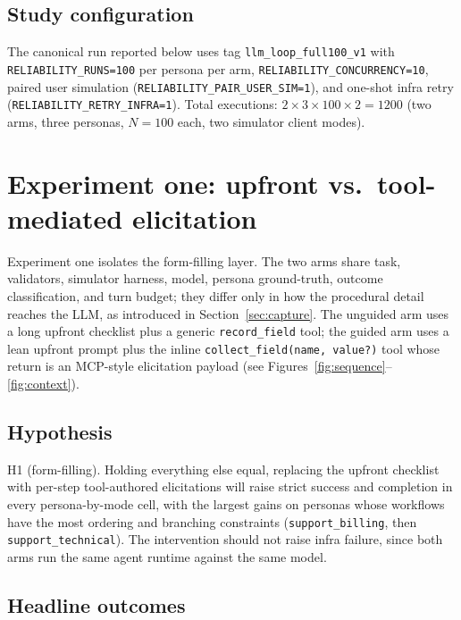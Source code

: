 \documentclass[11pt,a4paper]{article}
\begin{document}
\subsection{Study configuration}

The canonical run reported below uses tag \texttt{llm\_loop\_full100\_v1} with \texttt{RELIABILITY\_RUNS=100} per persona per arm, \texttt{RELIABILITY\_CONCURRENCY=10}, paired user simulation (\texttt{RELIABILITY\_PAIR\_USER\_SIM=1}), and one-shot infra retry (\texttt{RELIABILITY\_RETRY\_INFRA=1}). Total executions: $2 \times 3 \times 100 \times 2 = 1200$ (two arms, three personas, $N=100$ each, two simulator client modes).

\section{Experiment one: upfront vs.\ tool-mediated elicitation}
\label{sec:exp1}
\label{sec:results}

Experiment one isolates the form-filling layer. The two arms share task, validators, simulator harness, model, persona ground-truth, outcome classification, and turn budget; they differ only in how the procedural detail reaches the LLM, as introduced in Section~\ref{sec:capture}. The unguided arm uses a long upfront checklist plus a generic \texttt{record\_field} tool; the guided arm uses a lean upfront prompt plus the inline \texttt{collect\_field(name, value?)} tool whose return is an MCP-style elicitation payload (see Figures~\ref{fig:sequence}--\ref{fig:context}).

\subsection{Hypothesis}

H1 (form-filling). Holding everything else equal, replacing the upfront checklist with per-step tool-authored elicitations will raise strict success and completion in every persona-by-mode cell, with the largest gains on personas whose workflows have the most ordering and branching constraints (\texttt{support\_billing}, then \texttt{support\_technical}). The intervention should not raise infra failure, since both arms run the same agent runtime against the same model.

\subsection{Headline outcomes}
\end{document}
